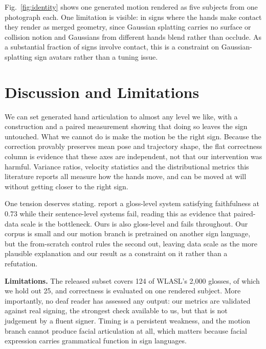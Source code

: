 \documentclass{article}
\begin{document}
Fig.~\ref{fig:identity} shows one generated motion rendered as five subjects from
one photograph each. One limitation is visible: in signs where the hands make
contact they render as merged geometry, since Gaussian splatting carries no
surface or collision notion and Gaussians from different hands blend rather than
occlude. As a substantial fraction of signs involve contact, this is a constraint
on Gaussian-splatting sign avatars rather than a tuning issue.

\section{Discussion and Limitations}
\label{sec:discussion}

We can set generated hand articulation to almost any level we like, with a
construction and a paired measurement showing that doing so leaves the sign
untouched. What we cannot do is make the motion be the right sign. Because the
correction provably preserves mean pose and trajectory shape, the flat
correctness column is evidence that these axes are independent, not that our
intervention was harmful. Variance ratios, velocity statistics and the
distributional metrics this literature reports all measure how the hands move,
and can be moved at will without getting closer to the right sign.

One tension deserves stating. \cite{hong2026collapse} report a gloss-level system
satisfying faithfulness at 0.73 while their sentence-level systems fail, reading
this as evidence that paired-data scale is the bottleneck. Ours is also
gloss-level and fails throughout. Our corpus is small and our motion branch is
pretrained on another sign language, but the from-scratch control rules the
second out, leaving data scale as the more plausible explanation and our result
as a constraint on it rather than a refutation.

\noindent\textbf{Limitations.} The released subset covers 124 of WLASL's 2,000
glosses, of which we hold out 25, and correctness is evaluated on one rendered
subject. More importantly, no deaf reader has assessed any output: our metrics
are validated against real signing, the strongest check available to us, but that
is not judgement by a fluent signer. Timing is a persistent weakness, and the
motion branch cannot produce facial articulation at all, which matters because
facial expression carries grammatical function in sign languages.



\end{document}
